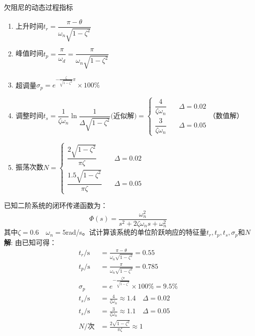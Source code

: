 \begin{ascolorbox9}{欠阻尼的动态过程指标}
    \begin{enumerate}
        \item 上升时间$t_r = \dfrac{\pi - \theta}{\omega_n \sqrt{1-\zeta^2}}$
        \item 峰值时间$t_p = \dfrac{\pi}{\omega_d} = \dfrac{\pi}{\omega_n \sqrt{1-\zeta^2}}$
        \item 超调量$\sigma_p = e^{-\frac{\zeta}{\sqrt{1-\zeta^2}}\pi} \times 100\%$
        \item 调整时间$t_s = \dfrac{1}{\zeta \omega_n} \ln\dfrac{1}{\Delta \sqrt{1-\zeta^2}}\text{(近似解)} = 
        \begin{cases}
            \dfrac{4}{\zeta \omega_n} & \quad \Delta = 0.02 \\
            \dfrac{3}{\zeta\omega_n} & \quad  \Delta = 0.05 
        \end{cases}\text{（数值解）}$
        \item 振荡次数$N = \begin{cases}
            \dfrac{2\sqrt{1-\zeta^2}}{\pi \zeta} & \quad \Delta = 0.02 \\
            \dfrac{1.5\sqrt{1-\zeta^2}}{\pi \zeta} & \quad \Delta = 0.05
        \end{cases}$
    \end{enumerate}
\end{ascolorbox9}

\begin{example}
    已知二阶系统的闭环传递函数为：
    \begin{equation*}
        \varPhi(s) = \frac{\omega_n^2}{s^2 + 2\zeta \omega_n s +\omega_n^2}
    \end{equation*}
    其中$\zeta = 0.6 \quad \omega_n = 5$rad/s。试计算该系统的单位阶跃响应的特征量$t_r,t_p,t_s,\sigma_p$和$N$\\
    \textbf{解}: 由已知可得：
    \begin{equation*}
        \begin{split}
            t_r/\mathrm{s} &= \frac{\pi-\theta}{\omega_n\sqrt{1-\zeta^2}} = 0.55 \\
            t_p/\mathrm{s} &= \frac{\pi}{\omega_n\sqrt{1-\zeta^2}} = 0.785 \\
            \sigma_p &= e^{-\frac{\zeta \pi}{\sqrt{1-\zeta^2}}}\times 100\% = 9.5\% \\
            t_s/\mathrm{s} &= \frac{4}{\zeta \omega_n} \approx 1.4 \quad \Delta = 0.02\\
            t_s/\mathrm{s} &= \frac{3}{\zeta \omega_n} \approx 1.1 \quad \Delta = 0.05 \\
            N/\text{次} &= \frac{2\sqrt{1-\zeta^2}}{\pi \zeta} \approx 1
        \end{split}
    \end{equation*}
\end{example}

